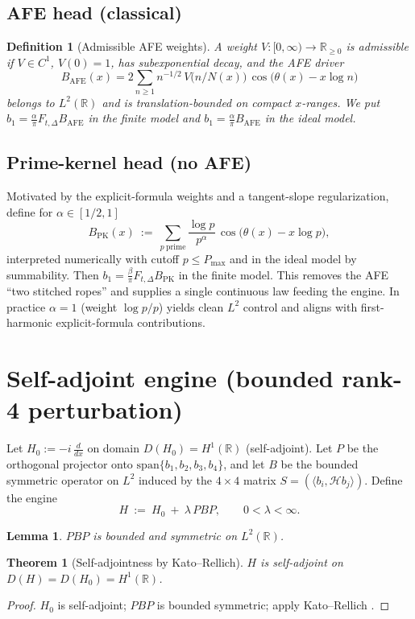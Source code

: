 \documentclass[11pt]{article}
\newtheorem{theorem}{Theorem}
\newtheorem{lemma}{Lemma}
\newtheorem{definition}{Definition}
\newcommand{\Hilb}{\mathcal H}
\begin{document}
{\subsection{AFE head (classical)}\label{subsec:afe}
\begin{definition}[Admissible AFE weights]\label{def:admissibleV}
A weight $V:[0,\infty)\to\mathbb R_{\ge 0}$ is \emph{admissible} if $V\in C^1$, $V(0)=1$,
has subexponential decay, and the AFE driver
\begin{equation*}
B_{\mathrm{AFE}}(x)=2\sum_{n\ge 1} n^{-1/2}\,V\!\big(n/N(x)\big)\,\cos\!\big(\theta(x)-x\log n\big)
\end{equation*}
belongs to $L^2(\mathbb R)$ and is translation-bounded on compact $x$-ranges.
We put $b_1=\frac{\alpha}{\pi} F_{t,\Delta} B_{\mathrm{AFE}}$ in the finite model and $b_1=\frac{\alpha}{\pi} B_{\mathrm{AFE}}$ in the ideal model.
\end{definition}

\subsection{Prime-kernel head (no AFE)}\label{subsec:primekernel}
Motivated by the explicit-formula weights and a tangent-slope regularization, define for $\alpha\in[1/2,1]$
\begin{equation}\label{eq:pk}
B_{\mathrm{PK}}(x)\ :=\ \sum_{p\ \mathrm{prime}} \frac{\log p}{p^\alpha}\,\cos\!\big(\theta(x)-x\log p\big),
\end{equation}
interpreted numerically with cutoff $p\le P_{\max}$ and in the ideal model by summability.
Then $b_1=\frac{\beta}{\pi}F_{t,\Delta} B_{\mathrm{PK}}$ in the finite model. This removes the AFE “two stitched ropes”
and supplies a single continuous law feeding the engine. In practice $\alpha=1$ (weight $\log p/p$) yields clean $L^2$ control
and aligns with first-harmonic explicit-formula contributions.

\section{Self-adjoint engine (bounded rank-4 perturbation)}
Let $H_0:=-i\,\frac{d}{dx}$ on domain $D(H_0)=H^1(\mathbb R)$ (self-adjoint). Let $P$ be the orthogonal projector onto
$\mathrm{span}\{b_1,b_2,b_3,b_4\}$, and let $B$ be the bounded symmetric operator on $L^2$ induced by the $4\times 4$ matrix
$S=(\langle b_i,\Hilb b_j\rangle)$. Define the engine
\begin{equation*}
H\ :=\ H_0\ +\ \lambda\,PBP,\qquad 0<\lambda<\infty.
\end{equation*}
\begin{lemma}
$PBP$ is bounded and symmetric on $L^2(\mathbb R)$.
\end{lemma}
\begin{theorem}[Self-adjointness by Kato--Rellich]\label{thm:kato}
$H$ is self-adjoint on $D(H)=D(H_0)=H^1(\mathbb R)$.
\end{theorem}
\begin{proof}
$H_0$ is self-adjoint; $PBP$ is bounded symmetric; apply Kato--Rellich \cite[Thm.~V.4.3]{kato1995perturbation}.
\end{proof}

}
\end{document}
